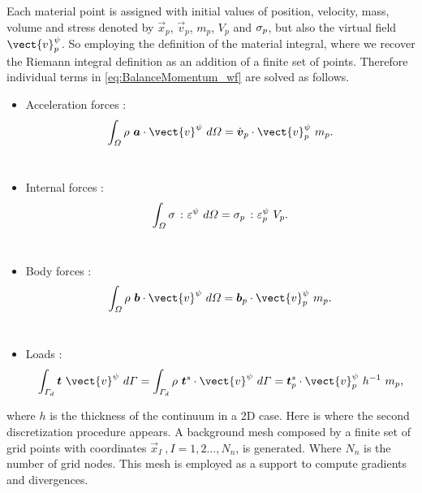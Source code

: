 Each material point is assigned with initial values of position,
velocity, mass, volume and stress denoted by $\vec{x}_p$,
$\vec{v}_p$, $m_p$,  $V_p$ and $\mathsf{\sigma}_p$, but also the
virtual field $\vect{v}^{\psi}_{p}$. So employing the definition of the
material integral, where we recover the Riemann integral definition as
an addition  of a finite set of points. Therefore individual terms in
\eqref{eq:BalanceMomentum_wf} are solved as follows. 
\begin{itemize}
\item Acceleration forces :
\begin{equation}
    \label{eq:particle_acceleration_forces}
    \Integral{3}{\rho\ \vec{a} \cdot \vect{v}^{\psi}} =
    \dot{\vec{v}}_{p} \cdot \vect{v}^{\psi}_{p}\ m_p.
  \end{equation}\\
\item Internal forces :
  \begin{equation}
    \label{eq:particle_internal_forces}
    \Integral{3}{\tens{\sigma}\ \colon \tens{\varepsilon}^{\psi}} =
   \tens{\sigma}_{p}\ \colon \tens{\varepsilon}^{\psi}_p \ V_p.
  \end{equation}\\
\item Body forces :
\begin{equation}
  \label{eq:particle_body_forces}
  \Integral{3}{\rho\ \vec{b} \cdot \vect{v}^{\psi} } = 
  \vec{b}_{p} \cdot \vect{v}^{\psi}_p\ m_p.
\end{equation}\\
\item Loads :
\begin{equation}
  \begin{aligned}
    \label{eq:particle_load_forces}
    \Integral{2}{\vec{t}\ \vect{v}^{\psi}} = \Integral{2}{\rho\
      \vec{t}^s \cdot \vect{v}^{\psi}} = \vec{t}^s_{p} \cdot \vect{v}^{\psi}_{p}\ h^{-1}\ m_p ,
  \end{aligned} 
\end{equation}
\end{itemize}
where $h$ is the thickness of the continuum in a 2D case. Here is
where the second discretization procedure appears. A background mesh
composed by a finite set of grid points with coordinates $\vec{x}_I\
, I = 1,2\ldots ,N_n$, is generated. Where $N_n$ is the number of grid
nodes. This mesh is employed as a support to compute gradients and divergences. 

